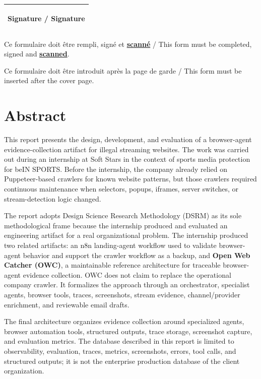 \documentclass[12pt,a4paper,twoside]{report}
\begin{document}
{\begin{center}
\begin{tabular}{|p{14cm}|}
\vspace{0.3cm}
\begin{center}
\textbf{Signature / Signature}
\end{center}

\vspace{3.5cm}
\\
\hline
\end{tabular}
\end{center}

\vspace{0.8cm}
Ce formulaire doit être rempli, signé et \underline{\textbf{scanné}} / This form must be completed, signed and \underline{\textbf{scanned}}.

Ce formulaire doit être introduit après la page de garde / This form must be inserted after the cover page.
}
\newpage

\hypersetup{pageanchor=true}


\chapter*{Abstract}
This report presents the design, development, and evaluation of a browser-agent evidence-collection artifact for illegal streaming websites. The work was carried out during an internship at Soft Stars in the context of sports media protection for beIN SPORTS. Before the internship, the company already relied on Puppeteer-based crawlers for known website patterns, but those crawlers required continuous maintenance when selectors, popups, iframes, server switches, or stream-detection logic changed.

The report adopts Design Science Research Methodology (DSRM) as its sole methodological frame because the internship produced and evaluated an engineering artifact for a real organizational problem. The internship produced two related artifacts: an n8n landing-agent workflow used to validate browser-agent behavior and support the crawler workflow as a backup, and \textbf{Open Web Catcher (OWC)}, a maintainable reference architecture for traceable browser-agent evidence collection. OWC does not claim to replace the operational company crawler. It formalizes the approach through an orchestrator, specialist agents, browser tools, traces, screenshots, stream evidence, channel/provider enrichment, and reviewable email drafts.

The final architecture organizes evidence collection around specialized agents, browser automation tools, structured outputs, trace storage, screenshot capture, and evaluation metrics. The database described in this report is limited to observability, evaluation, traces, metrics, screenshots, errors, tool calls, and structured outputs; it is not the enterprise production database of the client organization.
\end{document}
